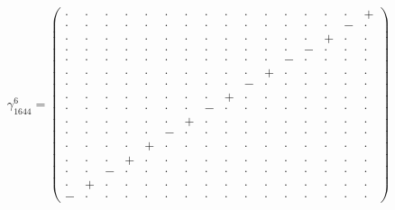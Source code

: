\documentclass[
  10pt,
]{article}
\begin{document}
\[\gamma_{1644}^6=\left(\begin{smallmatrix} \cdot & \cdot & \cdot & \cdot & \cdot & \cdot & \cdot & \cdot & \cdot & \cdot & \cdot & \cdot & \cdot & \cdot & \cdot & + \\ \cdot & \cdot & \cdot & \cdot & \cdot & \cdot & \cdot & \cdot & \cdot & \cdot & \cdot & \cdot & \cdot & \cdot & - & \cdot \\ \cdot & \cdot & \cdot & \cdot & \cdot & \cdot & \cdot & \cdot & \cdot & \cdot & \cdot & \cdot & \cdot & + & \cdot & \cdot \\ \cdot & \cdot & \cdot & \cdot & \cdot & \cdot & \cdot & \cdot & \cdot & \cdot & \cdot & \cdot & - & \cdot & \cdot & \cdot \\ \cdot & \cdot & \cdot & \cdot & \cdot & \cdot & \cdot & \cdot & \cdot & \cdot & \cdot & - & \cdot & \cdot & \cdot & \cdot \\ \cdot & \cdot & \cdot & \cdot & \cdot & \cdot & \cdot & \cdot & \cdot & \cdot & + & \cdot & \cdot & \cdot & \cdot & \cdot \\ \cdot & \cdot & \cdot & \cdot & \cdot & \cdot & \cdot & \cdot & \cdot & - & \cdot & \cdot & \cdot & \cdot & \cdot & \cdot \\ \cdot & \cdot & \cdot & \cdot & \cdot & \cdot & \cdot & \cdot & + & \cdot & \cdot & \cdot & \cdot & \cdot & \cdot & \cdot \\ \cdot & \cdot & \cdot & \cdot & \cdot & \cdot & \cdot & - & \cdot & \cdot & \cdot & \cdot & \cdot & \cdot & \cdot & \cdot \\ \cdot & \cdot & \cdot & \cdot & \cdot & \cdot & + & \cdot & \cdot & \cdot & \cdot & \cdot & \cdot & \cdot & \cdot & \cdot \\ \cdot & \cdot & \cdot & \cdot & \cdot & - & \cdot & \cdot & \cdot & \cdot & \cdot & \cdot & \cdot & \cdot & \cdot & \cdot \\ \cdot & \cdot & \cdot & \cdot & + & \cdot & \cdot & \cdot & \cdot & \cdot & \cdot & \cdot & \cdot & \cdot & \cdot & \cdot \\ \cdot & \cdot & \cdot & + & \cdot & \cdot & \cdot & \cdot & \cdot & \cdot & \cdot & \cdot & \cdot & \cdot & \cdot & \cdot \\ \cdot & \cdot & - & \cdot & \cdot & \cdot & \cdot & \cdot & \cdot & \cdot & \cdot & \cdot & \cdot & \cdot & \cdot & \cdot \\ \cdot & + & \cdot & \cdot & \cdot & \cdot & \cdot & \cdot & \cdot & \cdot & \cdot & \cdot & \cdot & \cdot & \cdot & \cdot \\ - & \cdot & \cdot & \cdot & \cdot & \cdot & \cdot & \cdot & \cdot & \cdot & \cdot & \cdot & \cdot & \cdot & \cdot & \cdot \end{smallmatrix}\right)\qquad
\]
\end{document}
